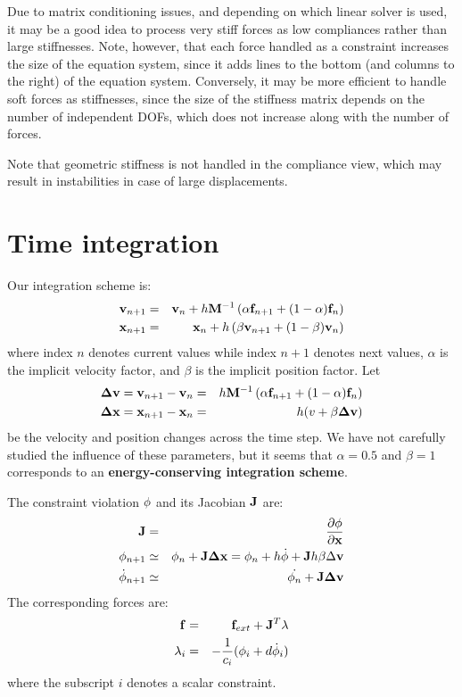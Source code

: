 Due to matrix conditioning issues, and depending on which linear solver is used, it may be a good idea to process very stiff forces as low compliances rather than large stiffnesses. Note, however, that each force handled as a constraint increases the size of the equation system, since it adds lines to the bottom (and columns to the right) of the equation system.
Conversely, it may be more efficient to handle soft forces as stiffnesses, since the size of the stiffness matrix depends on the number of independent DOFs, which does not increase along with the number of forces.

Note that geometric stiffness is not handled in the compliance view, which may result in instabilities in case of large displacements.


\section{Time integration} \label{sec:time integration}
Our integration scheme is:
\begin{eqnarray}
 \mathbf{v}_{n+1} &=& \mathbf{v}_{n} + h \mathbf{M}^{-1} \left(\alpha \mathbf{f}_{n+1} + (1-\alpha) \mathbf{f}_{n}\right) \label{eq ode velocity} \\
  \mathbf{x}_{n+1} &=& \mathbf{x}_{n} + h \left( \beta \mathbf{v}_{n+1} + (1-\beta) \mathbf{v}_{n} \right) \label{eq ode position}
\end{eqnarray}
where index $n$ denotes current values while index $n+1$ denotes next values, $\alpha$ is the implicit velocity factor, and $\beta$ is the implicit position factor. Let
\begin{eqnarray}
 \mathbf{\Delta v} = \mathbf{v}_{n+1} -    \mathbf{v}_{n}  &=& h \mathbf{M}^{-1} \left(\alpha \mathbf{f}_{n+1} + (1-\alpha) \mathbf{f}_{n}\right) \\
\mathbf{\Delta x} = \mathbf{x}_{n+1} -  \mathbf{x}_{n}    &=& h (v + \beta  \mathbf{\Delta v})
\end{eqnarray}
be the velocity and position changes across the time step.
We have not carefully studied the influence of these parameters, but it seems that $\alpha=0.5$ and $\beta=1$ corresponds to an \textbf{energy-conserving integration scheme}.


The constraint violation $\phi$ and its Jacobian $\mathbf{J}$ are:
\begin{eqnarray}
 \mathbf{J} &=& \frac{\partial \mathbf{\phi}}{\partial \mathbf{x}} \\
 \phi_{n+1} &\simeq& \phi_{n} + \mathbf{J} \mathbf{\Delta x} = \phi_{n} + h   \dot {\phi} + \mathbf{J} h \beta \Delta \mathbf{v}  \label{eq violnext}\\
\dot {\phi}_{n+1} &\simeq& \dot {\phi_{n}} + \mathbf{J} \mathbf{\Delta v} \label{eq dviolnext}
\end{eqnarray}
The corresponding forces are:
\begin{eqnarray}
 \mathbf{f} &=& \mathbf{f}_{ext} + \mathbf{J}^T \mathbf{\lambda} \\
 \mathbf{\lambda}_i &=& -\frac{1}{c_i} (  \phi_i + d \dot {\phi}_i ) \label{eq lambda}
\end{eqnarray}
where the subscript $i$ denotes a scalar constraint.

